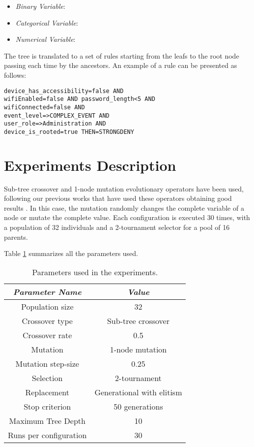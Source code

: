 \documentclass[a4paper,10pt,twocolumn,preprint,3p]{elsarticle}
\begin{document}
\begin{itemize}
\item {\em Binary Variable}: %
\item {\em Categorical Variable}:
\item {\em Numerical Variable}:

\end{itemize}

The tree is translated to a set of rules starting from the leafs to the root node passing each time by the ancestors. An example of a rule can be presented as follows:

\begin{verbatim}
device_has_accessibility=false AND
wifiEnabled=false AND password_length<5 AND
wifiConnected=false AND
event_level=>COMPLEX_EVENT AND
user_role=>Administration AND
device_is_rooted=true THEN=STRONGDENY
\end{verbatim}


\section{Experiments Description}
\label{sec:experiments}

Sub-tree crossover and 1-node mutation evolutionary operators have been used, following our previous works that have used these operators obtaining good results \cite{EvoStar2014:GPBot}. In this case, the mutation randomly changes the complete variable of a node or mutate the complete value. Each configuration is executed 30 times, with a population of 32 individuals and a 2-tournament selector for a pool of 16 parents.


Table \ref{tab:parameters} summarizes all the parameters used.

\begin{table}
\begin{center}
\begin{tabular}{|c|c|}
\hline
{\em Parameter Name} & {\em Value} \\\hline
Population size & 32 \\\hline
Crossover type & Sub-tree crossover \\ \hline
Crossover rate & 0.5\\ \hline
Mutation  & 1-node mutation\\ \hline
Mutation step-size & 0.25 \\ \hline
Selection & 2-tournament \\ \hline
Replacement & Generational with elitism\\ \hline
Stop criterion & 50 generations \\ \hline
Maximum Tree Depth & 10 \\ \hline %
Runs per configuration & 30 \\ \hline
\end{tabular}
\caption{Parameters used in the experiments.}
\label{tab:parameters}
\end{center}
\end{table}
\end{document}
